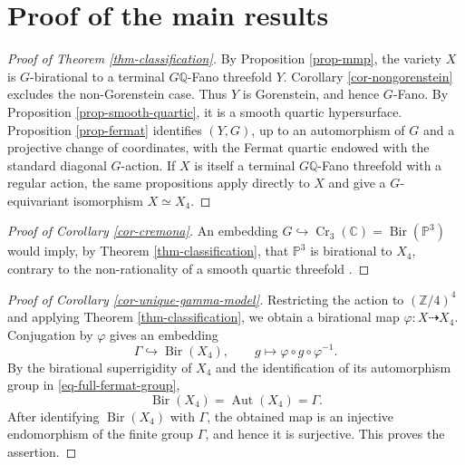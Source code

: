 \documentclass[10pt,oneside,reqno]{amsart}
\numberwithin{equation}{section}
\theoremstyle{definition}
\newcommand{\Z}{\mathbb Z}
\newcommand{\Q}{\mathbb Q}
\newcommand{\C}{\mathbb C}
\newcommand{\PP}{\mathbb P}
\newcommand{\Cr}{\operatorname{Cr}}
\begin{document}
\section{Proof of the main results}
\label{sec-proof-main-results}
\begin{proof}[Proof of Theorem \ref{thm-classification}]
By Proposition \ref{prop-mmp}, the variety $X$ is $G$-birational to a
terminal $G\Q$-Fano threefold $Y$.  Corollary
\ref{cor-nongorenstein} excludes the non-Gorenstein case.  Thus $Y$
is Gorenstein, and hence $G$-Fano.  By Proposition
\ref{prop-smooth-quartic}, it is a smooth quartic hypersurface.
Proposition \ref{prop-fermat} identifies $(Y,G)$, up to an
automorphism of $G$ and a projective change of coordinates, with the
Fermat quartic endowed with the standard diagonal $G$-action.  If $X$
is itself a terminal $G\Q$-Fano threefold with a regular action, the
same propositions apply directly to $X$ and give a $G$-equivariant
isomorphism $X\simeq X_4$.
\end{proof}

\begin{proof}[Proof of Corollary \ref{cor-cremona}]
An embedding $G\hookrightarrow\Cr_3(\C)=\operatorname{Bir}(\PP^3)$
would imply, by Theorem \ref{thm-classification}, that $\PP^3$ is birational
to $X_4$, contrary to the non-rationality of a smooth quartic
threefold \cite{IskovskikhManin}.
\end{proof}

\begin{proof}[Proof of Corollary \ref{cor-unique-gamma-model}]
Restricting the action to $(\Z/4)^4$ and applying Theorem
\ref{thm-classification}, we obtain a birational map
$\varphi\colon X\dashrightarrow X_4$.  Conjugation by $\varphi$ gives
an embedding
\[
 \Gamma\hookrightarrow\operatorname{Bir}(X_4),
 \qquad
 g\longmapsto\varphi\circ g\circ\varphi^{-1}.
\]
By the birational superrigidity of $X_4$
\cite{IskovskikhManin} and the identification of its automorphism group
in \eqref{eq-full-fermat-group},
\[
 \operatorname{Bir}(X_4)=\operatorname{Aut}(X_4)=\Gamma.
\]
After identifying $\operatorname{Bir}(X_4)$ with $\Gamma$, the obtained
map is an injective endomorphism of the finite group $\Gamma$, and hence
it is surjective.  This proves the assertion.
\end{proof}
\end{document}
